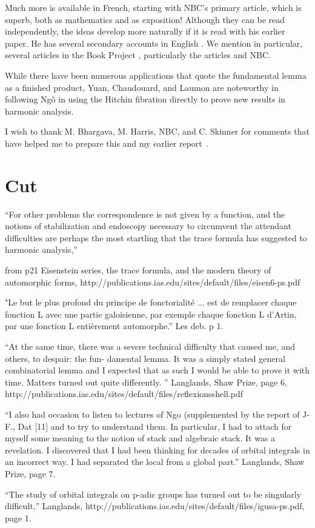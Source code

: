 \documentclass[brochure,english,12pt]{bourbaki}
\begin{document}
Much more is available in French, starting with NBC's primary article,
which is superb, both as mathematics and as exposition!  Although they
can be read independently, the ideas develop more naturally if it is
read with his earlier paper.  He has several secondary accounts in
English \cite{XX}.  We mention in particular, several articles in the
Book Project \cite{Harris}, particularly the articles \cite{Dat}
and NBC.

While there have been numerous applications that quote the fundamental
lemma as a finished product, Yuan, Chaudouard, and Laumon are
noteworthy in following Ng\^o in using the Hitchin fibration directly to
prove new results in harmonic analysis.

I wish to thank M. Bhargava, M. Harris, NBC, and C. Skinner for comments that
have helped me to prepare this and my earlier report~\cite{XX}.

\section{Cut}



\bigskip

``For other problems the correspondence is not given by a function, and the notions of 
stabilization and endoscopy necessary to circumvent the attendant difficulties are perhaps 
the most startling that the trace formula has suggested to harmonic analysis,'' 

from p21 Eisenstein series, the trace formula, and the modern theory of automorphic forms, http://publications.ias.edu/sites/default/files/eisen6-ps.pdf

"Le but le plus profond du principe de fonctorialit\'e ... est de remplacer chaque fonction L avec une partie galoisienne, par exemple chaque fonction L d'Artin, par une fonction L enti\`erement automorphe.'' Les deb. p 1.

``At the same 
time, there was a severe technical difficulty that caused me, and others, to despair: the fun- 
damental lemma. It was a simply stated general combinatorial lemma and I expected that as 
such I would be able to prove it with time. Matters turned out quite differently. ''  Langlands, Shaw Prize, page 6,
http://publications.ias.edu/sites/default/files/reflexionsshell.pdf

``I also had occasion to listen to lectures of Ngo (supplemented by the report of J-F., Dat [11] 
and to try to understand them. In particular, I had to attach for myself some meaning to the 
notion of stack and algebraic stack. It was a revelation. I discovered that I had been thinking 
for decades of orbital integrals in an incorrect way. I had separated the local from a global 
part.'' Langlands, Shaw Prize, page 7.



``The study of orbital integrals on p-adic groups has turned out to be singularly difficult,'' Langlands, 
http://publications.ias.edu/sites/default/files/igusa-ps.pdf,
page 1.

\end{document}
